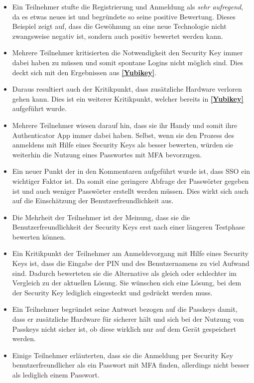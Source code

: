 \begin{itemize}
    \item Ein Teilnehmer stufte die Registrierung und Anmeldung als \glqq\textit{sehr aufregend}\grqq, da es etwas neues ist und begründete so seine positive Bewertung. Dieses Beispiel zeigt auf, dass die Gewöhnung an eine neue Technologie nicht zwangsweise negativ ist, sondern auch positiv bewertet werden kann.
    \item Mehrere Teilnehmer kritisierten die Notwendigkeit den Security Key immer dabei haben zu müssen und somit spontane Logins nicht möglich sind. Dies deckt sich mit den Ergebnissen aus \textbf{\ref{Yubikey}}.
    \item Daraus resultiert auch der Kritikpunkt, dass zusätzliche Hardware verloren gehen kann. Dies ist ein weiterer Kritikpunkt, welcher bereits in \textbf{\ref{Yubikey}} aufgeführt wurde.
    \item Mehrere Teilnehmer wiesen darauf hin, dass sie ihr Handy und somit ihre Authenticator App immer dabei haben. Selbst, wenn sie den Prozess des anmeldens mit Hilfe eines Security Keys als besser bewerten, würden sie weiterhin die Nutzung eines Passwortes mit \ac{MFA} bevorzugen. 
    \item Ein neuer Punkt der in den Kommentaren aufgeführt wurde ist, dass \ac{SSO} ein wichtiger Faktor ist. Da somit eine geringere Abfrage der Passwörter gegeben ist und auch weniger Passwörter erstellt werden müssen. Dies wirkt sich auch auf die Einschätzung der Benutzerfreundlichkeit aus.
    \item Die Mehrheit der Teilnehmer ist der Meinung, dass sie die Benutzerfreundlichkeit der Security Keys erst nach einer längeren Testphase bewerten können.
    \item Ein Kritikpunkt der Teilnehmer am Anmeldevorgang mit Hilfe eines Security Keys ist, dass die Eingabe der PIN und des Benutzernamens zu viel Aufwand sind. Dadurch bewerteten sie die Alternative als gleich oder schlechter im Vergleich zu der aktuellen Lösung. Sie wünschen sich eine Lösung, bei dem der Security Key lediglich eingesteckt und gedrückt werden muss.
    \item Ein Teilnehmer begründet seine Antwort bezogen auf die Passkeys damit, dass er zusätzliche Hardware für sicherer hält und sich bei der Nutzung von Passkeys nicht sicher ist, ob diese wirklich nur auf dem Gerät gespeichert werden.
    \item Einige Teilnehmer erläuterten, dass sie die Anmeldung per Security Key benutzerfreundlicher als ein Passwort mit \ac{MFA} finden, allerdings nicht besser als lediglich einem Passwort.

\end{itemize}
